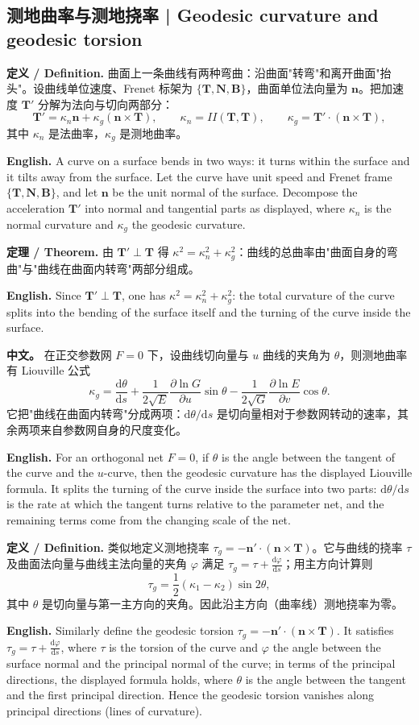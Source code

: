 \documentclass[UTF8,11pt,a4paper]{ctexart}
\newcommand{\APS}[2]{\par\noindent\textbf{中文。} #1\par\noindent\textbf{English.} #2\par\smallskip}
\newcommand{\EN}[1]{\par\noindent \textbf{English.} #1\par}
\newcommand{\DEF}[2]{\par\noindent\textbf{定义 / Definition.} #1\par\EN{#2}\par\smallskip}
\newcommand{\THM}[2]{\par\noindent\textbf{定理 / Theorem.} #1\par\EN{#2}\par\smallskip}
\newcommand{\dd}{\mathrm{d}}
\newcommand{\bn}{\mathbf{n}}
\newcommand{\bT}{\mathbf{T}}
\newcommand{\bN}{\mathbf{N}}
\newcommand{\bB}{\mathbf{B}}
\begin{document}
\subsection{测地曲率与测地挠率 | Geodesic curvature and geodesic torsion}
\DEF{曲面上一条曲线有两种弯曲：沿曲面"转弯"和离开曲面"抬头"。设曲线单位速度、Frenet 标架为 $\{\bT,\bN,\bB\}$，曲面单位法向量为 $\bn$。把加速度 $\bT'$ 分解为法向与切向两部分：
\[
\bT'=\kappa_n\bn+\kappa_g(\bn\times\bT),\qquad
\kappa_n=II(\bT,\bT),\qquad
\kappa_g=\bT'\cdot(\bn\times\bT),
\]
其中 $\kappa_n$ 是法曲率，$\kappa_g$ 是测地曲率。}{A curve on a surface bends in two ways: it turns within the surface and it tilts away from the surface. Let the curve have unit speed and Frenet frame $\{\bT,\bN,\bB\}$, and let $\bn$ be the unit normal of the surface. Decompose the acceleration $\bT'$ into normal and tangential parts as displayed, where $\kappa_n$ is the normal curvature and $\kappa_g$ the geodesic curvature.}
\THM{由 $\bT'\perp\bT$ 得 $\kappa^2=\kappa_n^2+\kappa_g^2$：曲线的总曲率由"曲面自身的弯曲"与"曲线在曲面内转弯"两部分组成。}{Since $\bT'\perp\bT$, one has $\kappa^2=\kappa_n^2+\kappa_g^2$: the total curvature of the curve splits into the bending of the surface itself and the turning of the curve inside the surface.}
\APS{在正交参数网 $F=0$ 下，设曲线切向量与 $u$ 曲线的夹角为 $\theta$，则测地曲率有 Liouville 公式
\[
\kappa_g=\frac{\dd\theta}{\dd s}
+\frac{1}{2\sqrt E}\frac{\partial\ln G}{\partial u}\sin\theta
-\frac{1}{2\sqrt G}\frac{\partial\ln E}{\partial v}\cos\theta .
\]
它把"曲线在曲面内转弯"分成两项：$\dd\theta/\dd s$ 是切向量相对于参数网转动的速率，其余两项来自参数网自身的尺度变化。}{For an orthogonal net $F=0$, if $\theta$ is the angle between the tangent of the curve and the $u$-curve, then the geodesic curvature has the displayed Liouville formula. It splits the turning of the curve inside the surface into two parts: $\dd\theta/\dd s$ is the rate at which the tangent turns relative to the parameter net, and the remaining terms come from the changing scale of the net.}
\DEF{类似地定义测地挠率 $\tau_g=-\bn'\cdot(\bn\times\bT)$。它与曲线的挠率 $\tau$ 及曲面法向量与曲线主法向量的夹角 $\varphi$ 满足 $\tau_g=\tau+\frac{\dd\varphi}{\dd s}$；用主方向计算则
\[
\tau_g=\frac12(\kappa_1-\kappa_2)\sin2\theta ,
\]
其中 $\theta$ 是切向量与第一主方向的夹角。因此沿主方向（曲率线）测地挠率为零。}{Similarly define the geodesic torsion $\tau_g=-\bn'\cdot(\bn\times\bT)$. It satisfies $\tau_g=\tau+\frac{\dd\varphi}{\dd s}$, where $\tau$ is the torsion of the curve and $\varphi$ the angle between the surface normal and the principal normal of the curve; in terms of the principal directions, the displayed formula holds, where $\theta$ is the angle between the tangent and the first principal direction. Hence the geodesic torsion vanishes along principal directions (lines of curvature).}
\end{document}
